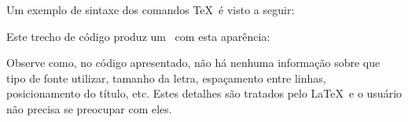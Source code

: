 Um exemplo de sintaxe dos comandos \TeX\ é visto a seguir:


Este trecho de código produz um \pdf\ com esta aparência:

\noindent{}

Observe como, no código apresentado, não há nenhuma informação sobre que tipo de fonte utilizar, tamanho da letra, espaçamento entre linhas, posicionamento do título, etc. Estes detalhes são tratados pelo \LaTeX\ e o usuário não precisa se preocupar com eles.